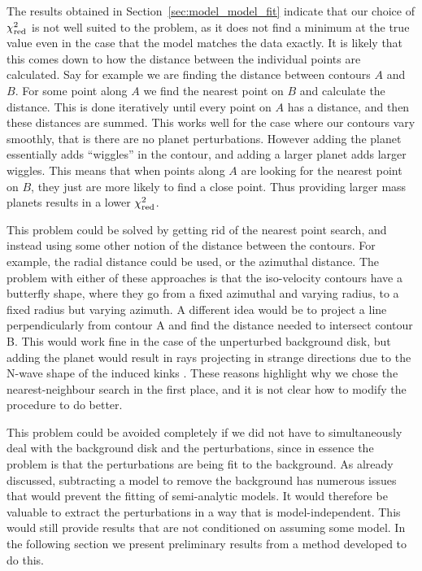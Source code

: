 The results obtained in Section~\ref{sec:model_model_fit} indicate that our choice of $\chi^2_{\rm red}$ is not well suited to the problem, as it does not find a minimum at the true value even in the case that the model matches the data exactly.
It is likely that this comes down to how the distance between the individual points are calculated.
Say for example we are finding the distance between contours $A$ and $B$.
For some point along $A$ we find the nearest point on $B$ and calculate the distance.
This is done iteratively until every point on $A$ has a distance, and then these distances are summed.
This works well for the case where our contours vary smoothly, that is there are no planet perturbations.
However adding the planet essentially adds ``wiggles'' in the contour, and adding a larger planet adds larger wiggles.
This means that when points along $A$ are looking for the nearest point on $B$, they just are more likely to find a close point.
Thus providing larger mass planets results in a lower $\chi^2_{\rm red}$.

This problem could be solved by getting rid of the nearest point search, and instead using some other notion of the distance between the contours. 
For example, the radial distance could be used, or the azimuthal distance.
The problem with either of these approaches is that the iso-velocity contours have a butterfly shape, where they go from a fixed azimuthal and varying radius, to a fixed radius but varying azimuth.
A different idea would be to project a line perpendicularly from contour A and find the distance needed to intersect contour B.
This would work fine in the case of the unperturbed background disk, but adding the planet would result in rays projecting in strange directions due to the N-wave shape of the induced kinks \citep{goodman2001,bollati2021}.
These reasons highlight why we chose the nearest-neighbour search in the first place, and it is not clear how to modify the procedure to do better.

This problem could be avoided completely if we did not have to simultaneously deal with the background disk and the perturbations, since in essence the problem is that the perturbations are being fit to the background.
As already discussed, subtracting a model to remove the background has numerous issues that would prevent the fitting of semi-analytic models.
It would therefore be valuable to extract the perturbations in a way that is model-independent.
This would still provide results that are not conditioned on assuming some model.
In the following section we present preliminary results from a method developed to do this.

